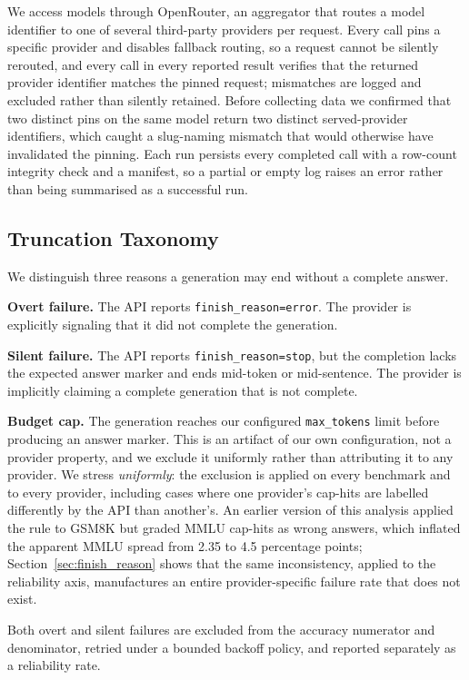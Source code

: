 \documentclass[11pt]{article}
\begin{document}
We access models through OpenRouter, an aggregator that routes a model
identifier to one of several third-party providers per request. Every
call pins a specific provider and disables fallback routing, so a
request cannot be silently rerouted, and every call in every reported
result verifies that the returned provider identifier matches the
pinned request; mismatches are logged and excluded rather than
silently retained. Before collecting data we confirmed that two
distinct pins on the same model return two distinct served-provider
identifiers, which caught a slug-naming mismatch that would otherwise
have invalidated the pinning. Each run persists every completed call
with a row-count integrity check and a manifest, so a partial or empty
log raises an error rather than being summarised as a successful run.

\subsection{Truncation Taxonomy}
\label{sec:taxonomy}

We distinguish three reasons a generation may end without a complete
answer.

\textbf{Overt failure.} The API reports
\texttt{finish\_reason=error}. The provider is explicitly signaling
that it did not complete the generation.

\textbf{Silent failure.} The API reports
\texttt{finish\_reason=stop}, but the completion lacks the expected
answer marker and ends mid-token or mid-sentence. The provider is
implicitly claiming a complete generation that is not complete.

\textbf{Budget cap.} The generation reaches our configured
\texttt{max\_tokens} limit before producing an answer marker. This is
an artifact of our own configuration, not a provider property, and we
exclude it uniformly rather than attributing it to any provider. We
stress \emph{uniformly}: the exclusion is applied on every benchmark
and to every provider, including cases where one provider's cap-hits
are labelled differently by the API than another's. An earlier version
of this analysis applied the rule to GSM8K but graded MMLU cap-hits as
wrong answers, which inflated the apparent MMLU spread from 2.35 to
4.5 percentage points; Section~\ref{sec:finish_reason} shows that the
same inconsistency, applied to the reliability axis, manufactures an
entire provider-specific failure rate that does not exist.

Both overt and silent failures are excluded from the accuracy
numerator and denominator, retried under a bounded backoff policy, and
reported separately as a reliability rate.
\end{document}
